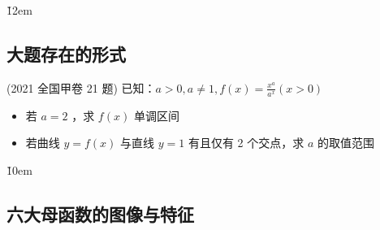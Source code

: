 \v{12em}

\subsection{大题存在的形式}

\begin{example}
    (2021 全国甲卷 21 题)
    已知：$a>0, a \neq 1, f(x)=\frac{x^a}{a^x}(x>0)$
    \begin{itemize}
        \item 若 $a=2$ ，求 $f(x)$ 单调区间
        \item 若曲线 $y=f(x)$ 与直线 $y=1$ 有且仅有 2 个交点，求 $a$ 的取值范围
    \end{itemize}
\end{example}

\v{10em}

\subsection{六大母函数的图像与特征}

